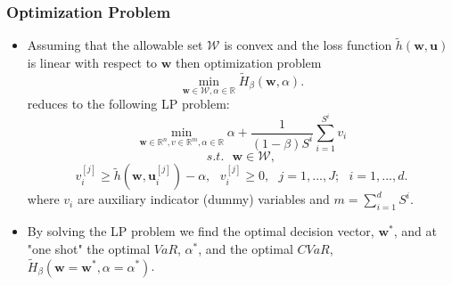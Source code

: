 \documentclass[pdf,9pt,xcolor=dvipsnames,hide notes]{beamer}
\begin{document}
\begin{frame}[label=frame3f]
	\frametitle{Optimization Problem}
	
	\begin{itemize}
		\justifying
		
		\item Assuming that the allowable set $\mathcal{W}$ is convex and the loss
		function $\widetilde{h}\left( \mathbf{w,u}\right) $ is linear with respect to $\mathbf{w}
		$ then optimization problem
		\begin{equation}
		\underset{\mathbf{w}\in \mathcal{W},\alpha \in
			\mathbb{R}
		}{\min }\widetilde{H}_{\beta }\left( \mathbf{w},\alpha \right) .
		\end{equation}%
		reduces to the following LP problem:%
		\begin{equation}
		\underset{\mathbf{w}\in
			\mathbb{R}
			^{n},v\in
			\mathbb{R}
			^{m},\alpha \in
			\mathbb{R}
		}{\min }\alpha +\frac{1}{\left( 1-\beta \right) S^{i}}\sum_{i=1}^{S^{i}}v_{i}
		\end{equation}%
		\begin{equation}
		s.t.\text{ }\mathbf{w}\in \mathcal{W},  \label{set}
		\end{equation}%
		\begin{equation}
		v_{i}^{\left[ j\right] }\geq \widetilde{h}(\mathbf{w},\mathbf{u}_{i}^{[j]})-\alpha ,%
		\text{ }v_{i}^{\left[ j\right] }\geq 0,\text{ }j=1,...,J;\text{ }i=1,...,d.
		\end{equation}%
		where $v_{i}$ are auxiliary indicator (dummy) variables and $%
		m=\sum_{i=1}^{d}S^{i}$. 
		
		\vspace{0.3cm}
		
		\item By solving the LP problem we find the optimal
		decision vector, $\mathbf{w}^{\ast }$, and at "one shot" the optimal $VaR$, $%
		\alpha ^{\ast }$, and the optimal $CVaR$, \\ $\widetilde{H}_{\beta }\left(
		\mathbf{w}=\mathbf{w}^{\ast },\alpha =\alpha ^{\ast }\right) $.
		
		
		\end{itemize}
\end{frame}
\end{document}
